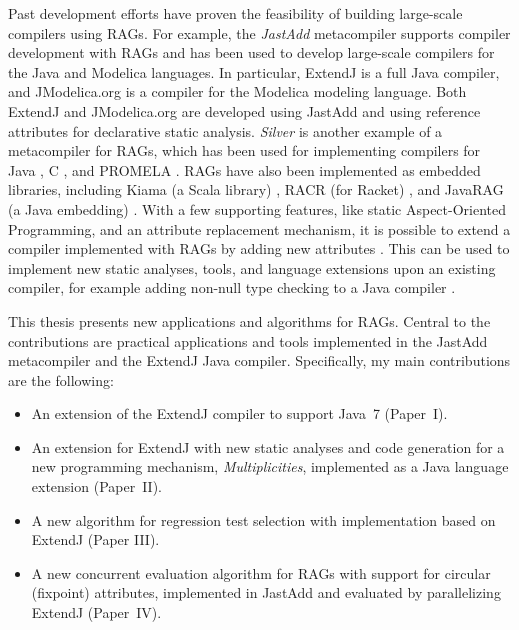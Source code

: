 \documentclass[10pt, twoside, openright]{book}
\begin{document}

Past development efforts have
proven the feasibility of building large-scale compilers using RAGs.
For example, the \emph{JastAdd} \cite{DBLP:journals/scp/HedinM03} metacompiler supports compiler development
with RAGs and has been used to develop large-scale compilers for the Java and Modelica languages.
In particular, ExtendJ \cite{jastaddj} is a full Java compiler,
and JModelica.org \cite{DBLP:journals/cce/AkessonAGBT10}
is a compiler for the Modelica modeling language. Both ExtendJ and JModelica.org are developed
using JastAdd and using reference attributes for declarative static analysis.
\emph{Silver} \cite{DBLP:journals/scp/WykBGK10} is another example of a metacompiler for RAGs, which has been used
for implementing compilers for Java \cite{DBLP:conf/ecoop/WykKBS07}, C \cite{DBLP:journals/pacmpl/KaminskiKCW17}, and PROMELA \cite{DBLP:conf/spin/MaliW11}.
RAGs have also been implemented as embedded libraries, including
Kiama (a Scala library) \cite{DBLP:conf/gttse/Sloane09}, RACR (for Racket) \cite{DBLP:conf/sle/Burger15},
and JavaRAG (a Java embedding) \cite{DBLP:conf/aosd/ForsCH15}.
With a few supporting features, like static Aspect-Oriented Programming, and an attribute replacement
mechanism, it is possible to
extend a compiler implemented with RAGs by adding new attributes \cite{DBLP:conf/aosd/AvgustinovET08}.
This can be used to implement new static analyses, tools, and language
extensions upon an existing compiler, for example adding non-null type checking
to a Java compiler \cite{DBLP:journals/jot/EkmanH07}.


This thesis presents new applications and algorithms for RAGs.
Central to the contributions are practical applications and tools implemented in the
JastAdd metacompiler and the ExtendJ Java compiler.
Specifically, my main contributions are the following:

\begin{itemize}
  \item An extension of the ExtendJ compiler to support Java~7 (Paper~I).
  \item An extension for ExtendJ with new static analyses and code generation for
    a new programming mechanism, \emph{Multiplicities}, implemented as a Java language extension
    (Paper~II).
  \item A new algorithm for regression test selection with implementation based on ExtendJ (Paper
    III).
  \item A new concurrent evaluation algorithm for RAGs with support for circular (fixpoint)
    attributes, implemented in JastAdd and evaluated by parallelizing ExtendJ (Paper~IV).
\end{itemize}
\end{document}
